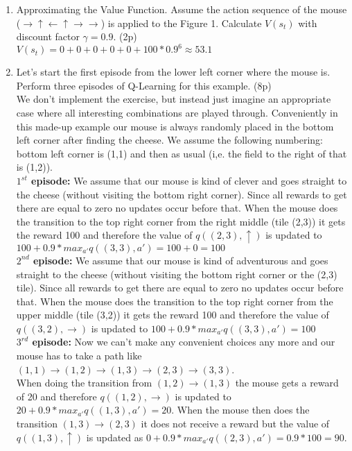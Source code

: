 \documentclass{article}
\begin{document}
\begin{enumerate}
    \item Approximating the Value Function. Assume the action sequence of the mouse ($\rightarrow \uparrow \leftarrow \uparrow \rightarrow \rightarrow$) is applied to the Figure 1.
Calculate $V(s_t)$ with discount factor $\gamma = 0.9.$ (2p) \\
    $V(s_t) = 0+0+0+0+0+100*0.9^{6} \approx 53.1$
    \item  Let's start the first episode from the lower left corner where the mouse is. Perform
three episodes of Q-Learning for this example. (8p) \\
    We don't implement the exercise, but instead just imagine an appropriate case where all interesting combinations are played through. Conveniently in this made-up example our mouse is always randomly placed in the bottom left corner after finding the cheese. We assume the following numbering: bottom left corner is (1,1) and then as usual (i,e. the field to the right of that is (1,2)).\\
    \textbf{$1^{st}$ episode:} We assume that our mouse is kind of clever and goes straight to the cheese (without visiting the bottom right corner). Since all rewards to get there are equal to zero no updates occur before that. When the mouse does the transition to the top right corner from the right middle (tile (2,3)) it gets the reward 100 and therefore the value of $q((2,3),\uparrow)$ is updated to $100 + 0.9 * max_{a'} q((3,3),a') = 100 + 0 = 100$ \\
    \textbf{$2^{nd}$ episode:} We assume that our mouse is kind of adventurous and goes straight to the cheese (without visiting the bottom right corner or the (2,3) tile). Since all rewards to get there are equal to zero no updates occur before that. When the mouse does the transition to the top right corner from the upper middle (tile (3,2)) it gets the reward 100 and therefore the value of $q((3,2),\rightarrow)$ is updated to $100 + 0.9 * max_{a'} q((3,3),a') = 100$ \\
    \textbf{$3^{rd}$ episode:} Now we can't make any convenient choices any more and our mouse has to take a path like $(1,1) \to (1,2) \to (1,3) \to (2,3) \to (3,3)$. \\
    When doing the transition from $(1,2) \to (1,3)$ the mouse gets a reward of 20 and therefore $q((1,2),\rightarrow)$ is updated to $20 + 0.9 * max_{a'} q((1,3),a') = 20$. When the mouse then does the transition $(1,3) \to (2,3)$ it does not receive a reward but the value of $q((1,3),\uparrow)$ is updated as $0 + 0.9 * max_{a'} q((2,3),a') = 0.9 * 100 = 90$.
\end{enumerate}
\end{document}

